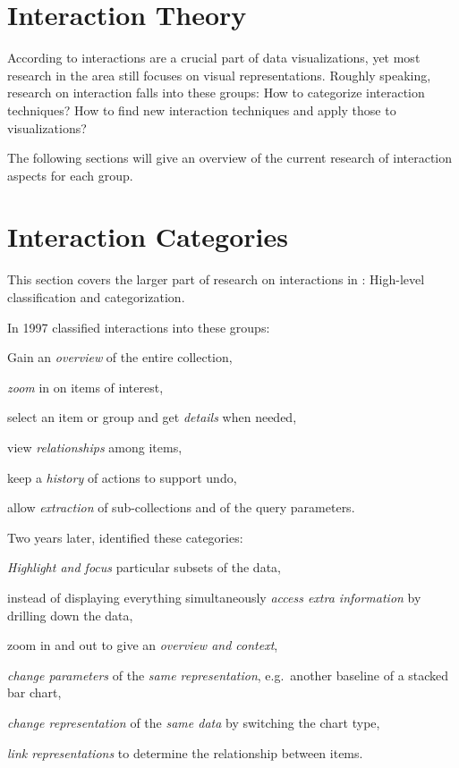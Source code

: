 \section{Interaction Theory}\label{sec:related-work:interaction-theory}
According to \textcite{Ho2013} interactions are a crucial part of data visualizations, yet most research in the area still focuses on visual representations.
Roughly speaking, research on interaction falls into these groups:
How to categorize interaction techniques?
How to find new interaction techniques and apply those to visualizations?

The following sections will give an overview of the current research of interaction aspects for each group.

\section{Interaction Categories}\label{sec:related-work:interaction-theory:categories}
This section covers the larger part of research on interactions in \cmvs{}:
High-level classification and categorization.

In 1997 \textcite{Shneiderman1996} classified interactions into these groups:
\begin{enumerate*}[label=(\arabic*)]
  \item
    Gain an \emph{overview} of the entire collection,
  \item
    \emph{zoom} in on items of interest,
  \item
    select an item or group and get \emph{details} when needed,
  \item
    view \emph{relationships} among items,
  \item
    keep a \emph{history} of actions to support undo,
  \item
    allow \emph{extraction} of sub-collections and of the query parameters.
\end{enumerate*}

Two years later, \textcite{Dix1998} identified these categories:
\begin{enumerate*}[label=(\arabic*)]
  \item
    \emph{Highlight and focus} particular subsets of the data,
  \item
    instead of displaying everything simultaneously \emph{access extra information} by drilling down the data,
  \item
    zoom in and out to give an \emph{overview and context},
  \item
    \emph{change parameters} of the \emph{same representation}, e.g.\ another baseline of a stacked bar chart,
  \item
    \emph{change representation} of the \emph{same data} by switching the chart type,
  \item
    \emph{link representations} to determine the relationship between items.
\end{enumerate*}

